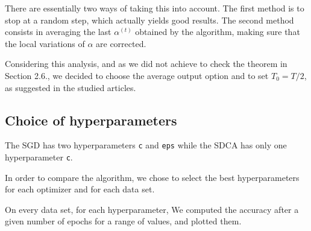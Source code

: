\documentclass{article}
\begin{document}
There are essentially two ways of taking this into account.
The first method is to stop at a random step, which actually yields good results.
The second method consists in averaging the last $\alpha^{(t)}$ obtained by the algorithm, making sure that the local variations of $\alpha$ are corrected.


Considering this analysis, and as we did not achieve to check the theorem in Section 2.6., we decided to choose the average output option and to set $T_0 = T/2$, as suggested in the studied articles.

\subsection{Choice of hyperparameters}

The SGD has two hyperparameters \texttt{c} and \texttt{eps} while the SDCA has only one hyperparameter \texttt{c}.

In order to compare the algorithm, we chose to select the best hyperparameters for each optimizer and for each data set.

On every data set, for each hyperparameter, We computed the accuracy after a given number of epochs for a range of values, and plotted them.
\end{document}
